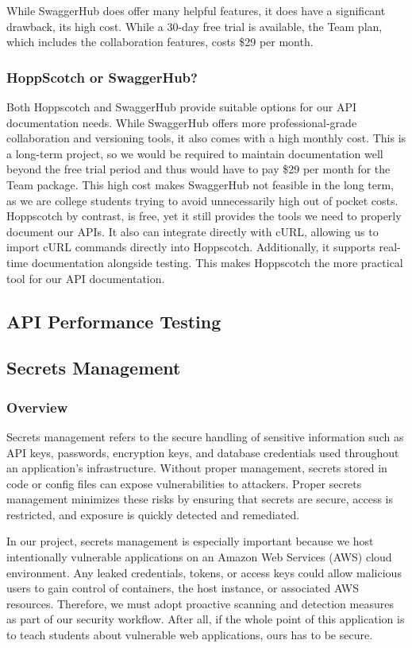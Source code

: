 \documentclass[12pt]{article}
\begin{document}
While SwaggerHub does offer many helpful features, it does have a significant drawback, its high cost. While a 30-day free trial is available, the Team plan, which includes the collaboration features, costs \$29 per month.

\subsubsection{HoppScotch or SwaggerHub?}
Both Hoppscotch and SwaggerHub provide suitable options for our API documentation needs. While SwaggerHub offers more professional-grade collaboration and versioning tools, it also comes with a high monthly cost. This is a long-term project, so we would be required to maintain documentation well beyond the free trial period and thus would have to pay \$29 per month for the Team package. This high cost makes SwaggerHub not feasible in the long term, as we are college students trying to avoid unnecessarily high out of pocket costs. Hoppscotch by contrast, is free, yet it still provides the tools we need to properly document our APIs. It also can integrate directly with cURL, allowing us to import cURL commands directly into Hoppscotch. Additionally, it supports real-time documentation alongside testing. This makes Hoppscotch the more practical tool for our API documentation.

\subsection{API Performance Testing}

\subsection{Secrets Management}

\subsubsection{Overview}
Secrets management refers to the secure handling of sensitive information such as API keys, passwords, encryption keys, and database credentials used throughout an application's infrastructure. Without proper management, secrets stored in code or config files can expose vulnerabilities to attackers. Proper secrets management minimizes these risks by ensuring that secrets are secure, access is restricted, and exposure is quickly detected and remediated. 

In our project, secrets management is especially important because we host intentionally vulnerable applications on an Amazon Web Services (AWS) cloud environment. Any leaked credentials, tokens, or access keys could allow malicious users to gain control of containers, the host instance, or associated AWS resources. Therefore, we must adopt proactive scanning and detection measures as part of our security workflow. After all, if the whole point of this application is to teach students about vulnerable web applications, ours has to be secure.
\end{document}
